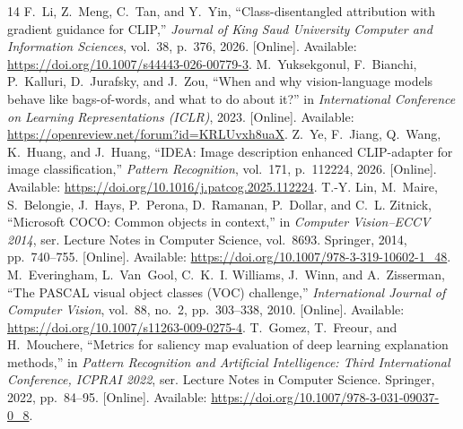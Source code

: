 \begin{thebibliography}{14}
F.~Li, Z.~Meng, C.~Tan, and Y.~Yin, ``Class-disentangled attribution with gradient
guidance for {CLIP},'' \emph{Journal of King Saud University Computer and
Information Sciences}, vol.~38, p.~376, 2026. [Online]. Available:
\url{https://doi.org/10.1007/s44443-026-00779-3}.
M.~Yuksekgonul, F.~Bianchi, P.~Kalluri, D.~Jurafsky, and J.~Zou, ``When and why
vision-language models behave like bags-of-words, and what to do about it?'' in
\emph{International Conference on Learning Representations (ICLR)}, 2023.
[Online]. Available: \url{https://openreview.net/forum?id=KRLUvxh8uaX}.
Z.~Ye, F.~Jiang, Q.~Wang, K.~Huang, and J.~Huang, ``{IDEA}: Image description
enhanced {CLIP}-adapter for image classification,'' \emph{Pattern Recognition},
vol.~171, p.~112224, 2026. [Online]. Available:
\url{https://doi.org/10.1016/j.patcog.2025.112224}.
T.-Y. Lin, M.~Maire, S.~Belongie, J.~Hays, P.~Perona, D.~Ramanan, P.~Dollar,
and C.~L. Zitnick, ``Microsoft {COCO}: Common objects in context,'' in
\emph{Computer Vision--ECCV 2014}, ser. Lecture Notes in Computer Science,
vol.~8693. Springer, 2014, pp.~740--755. [Online]. Available:
\url{https://doi.org/10.1007/978-3-319-10602-1_48}.
M.~Everingham, L.~Van~Gool, C.~K.~I. Williams, J.~Winn, and A.~Zisserman,
``The {PASCAL} visual object classes ({VOC}) challenge,'' \emph{International
Journal of Computer Vision}, vol.~88, no.~2, pp.~303--338, 2010. [Online]. Available:
\url{https://doi.org/10.1007/s11263-009-0275-4}.
T.~Gomez, T.~Freour, and H.~Mouchere, ``Metrics for saliency map evaluation of
deep learning explanation methods,'' in \emph{Pattern Recognition and
Artificial Intelligence: Third International Conference, ICPRAI 2022}, ser.
Lecture Notes in Computer Science. Springer, 2022, pp.~84--95. [Online]. Available:
\url{https://doi.org/10.1007/978-3-031-09037-0_8}.
\end{thebibliography}
